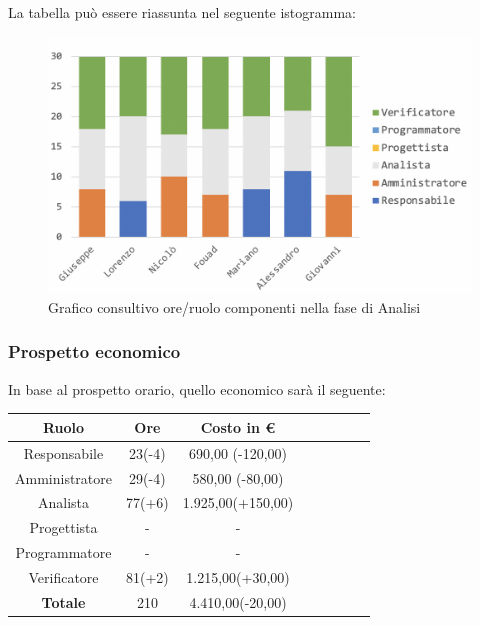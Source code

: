 			La tabella può essere riassunta nel seguente istogramma:
			
			\begin{figure}[H]
				\centering
				\includegraphics[width=0.8\linewidth]{./images/analisiCons1.png}
				\caption{Grafico consultivo ore/ruolo componenti nella fase di Analisi}
				\label{fig:consultivo grafico suddivione ruoli fase Analisi}
			\end{figure}
			
		\subsubsection{Prospetto economico}
			In base al prospetto orario, quello economico sarà il seguente: 
			
			\begin{longtable}{|c|c|c|c|c|c|c|c}
				\hline
				\rowcolor{lighter-grayer}
				\textbf{Ruolo} & \textbf{Ore} & \textbf{Costo in €} \\
				\hline
				\endfirsthead
				
				\hline
				Responsabile & 23(-4) & 690,00 (-120,00)\\
				\hline
				\hline
				Amministratore & 29(-4) & 580,00 (-80,00)\\
				\hline
				\hline
				Analista & 77(+6) & 1.925,00(+150,00)\\
				\hline
				\hline
				Progettista & - & -\\
				\hline
				\hline
				Programmatore & - & -\\
				\hline
				\hline
				Verificatore & 81(+2) & 1.215,00(+30,00)\\
				\hline
				\textbf{Totale} & 210 & 4.410,00(-20,00)\\
				\hline
				
			\end{longtable}
			\pagebreak
			
